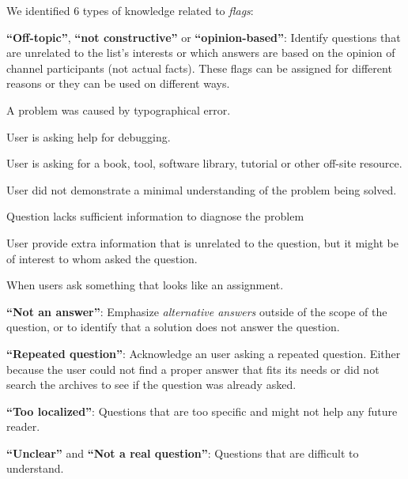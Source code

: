     We identified 6 types of knowledge related to \textit{flags}:
    \begin{packed_enum}
        \item \textbf{``Off-topic''}, \textbf{``not constructive''} or \textbf{``opinion-based''}: Identify questions that are unrelated to the list's interests or which answers are based on the opinion of channel participants (not actual facts).
        These flags can be assigned for different reasons or they can be used on different ways.
        \begin{description}[itemsep=3pt, topsep=2pt, leftmargin=3em, parsep=0pt]
            \item[\textit{Typographical error}:] A problem was caused by typographical error.
            \item[\textit{Debugging help}:] User is asking help for debugging.
            \item[\textit{Book, tool, software library}:] User is asking for a book, tool, software library, tutorial or other off-site resource.
            \item[\textit{Minimal understanding}:] User did not demonstrate a minimal understanding of the problem being solved.
            \item[\textit{Insufficient information}:] Question lacks sufficient information to diagnose the problem
            \item[\textit{Extra information}:] User provide extra information that is unrelated to the question, but it might be of interest to whom asked the question.
            \item[\textit{Homework}:] When users ask something that looks like an assignment.
        \end{description}
        \item \textbf{``Not an answer''}: Emphasize \textit{alternative answers} outside of the scope of the question, or to identify that a solution does not answer the question.
        \item \textbf{``Repeated question''}: Acknowledge an user asking a repeated question.
        Either because the user could not find a proper answer that fits its needs or did not search the archives to see if the question was already asked.
        \item \textbf{``Too localized''}: Questions that are too specific and might not help any future reader.
        \item \textbf{``Unclear''} and  \textbf{``Not a real question''}: Questions that are difficult to understand.
    \end{packed_enum}

